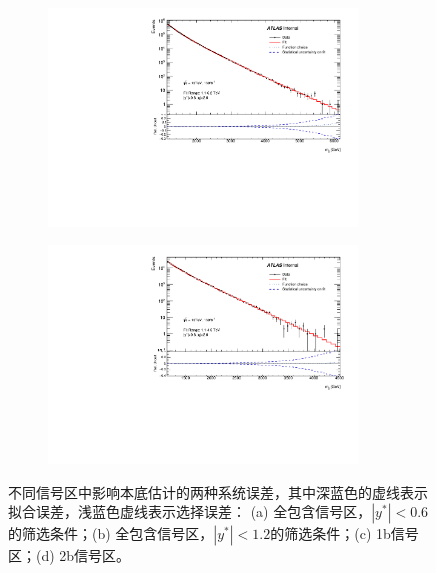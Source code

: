 \begin{figure}[!thbp]
\begin{subfigure}{.5\textwidth}
  \caption{}
  \end{subfigure}
\newline 
  \begin{subfigure}{.5\textwidth}
  \centering
  \includegraphics[width=0.9\textwidth]{figuresDijet/07-SystematicUncertainties/uncertmbj.pdf}
  \caption{}
  \end{subfigure}
  \begin{subfigure}{.5\textwidth}
  \centering
  \includegraphics[width=0.9\textwidth]{figuresDijet/07-SystematicUncertainties/uncertmbb.pdf}
  \caption{}
  \end{subfigure}
  \caption{
   不同信号区中影响本底估计的两种系统误差，其中深蓝色的虚线表示拟合误差，浅蓝色虚线表示选择误差：
   (a) 全包含信号区，$|y^*|<0.6$的筛选条件；(b) 全包含信号区，$|y^*|<1.2$的筛选条件；(c) 1b信号区；(d) 2b信号区。
}
\label{fig:Syst1}
\end{figure}



